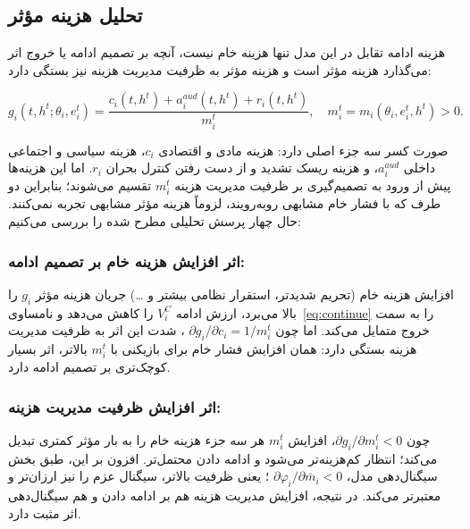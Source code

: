 \documentclass[12pt]{article}
\begin{document}
\subsection{تحلیل هزینه مؤثر}

هزینه ادامه تقابل در این مدل تنها هزینه خام نیست،
 آنچه بر تصمیم ادامه یا خروج اثر می‌گذارد هزینه مؤثر
 است و هزینه مؤثر به ظرفیت مدیریت هزینه نیز بستگی دارد:

\begin{equation}
    \label{eq:geff}
    g_i(t,h^t;\theta_i,e_i^t) = \frac{c_i(t,h^t) + a_i^{aud}(t,h^t) + r_i(t,h^t)}{m_i^t},
    \quad m_i^t = m_i(\theta_i,e_i^t,h^t) > 0.
\end{equation}

صورت کسر سه جزء اصلی دارد: هزینه مادی و اقتصادی 
$c_i$،
 هزینه سیاسی و اجتماعی داخلی 
$a_i^{aud}$،
 و هزینه ریسک تشدید و از دست رفتن کنترل بحران 
 $r_i$. اما این هزینه‌ها پیش از ورود به تصمیم‌گیری بر ظرفیت مدیریت هزینه 
 $m_i^t$
  تقسیم می‌شوند؛ بنابراین دو طرف که با فشار خام
   مشابهی روبه‌رویند، لزوماً هزینه مؤثر مشابهی تجربه نمی‌کنند.
   حال چهار پرسش تحلیلی مطرح شده را بررسی می‌کنیم:

\subsubsection*{اثر افزایش هزینه خام بر تصمیم ادامه:}
        افزایش هزینه خام 
        (تحریم شدیدتر، استقرار نظامی بیشتر و \dots)
         جریان هزینه مؤثر $g_i$
          را بالا می‌برد، ارزش ادامه $V_i^C$
           را کاهش می‌دهد و نامساوی~\eqref{eq:continue}
            را به سمت خروج متمایل می‌کند. اما چون 
            $\partial g_i/\partial c_i = 1/m_i^t$
            ، شدت این اثر به ظرفیت مدیریت هزینه بستگی دارد:
             همان افزایش فشار خام برای بازیکنی با 
             $m_i^t$
         بالاتر، اثر بسیار کوچک‌تری بر تصمیم ادامه دارد.
        
\subsubsection*{اثر افزایش ظرفیت مدیریت هزینه:}
        چون $\partial g_i/\partial m_i^t < 0$،
         افزایش $m_i^t$
          هر سه جزء هزینه خام را به
           بار مؤثر کمتری تبدیل می‌کند؛ انتظار کم‌هزینه‌تر می‌شود و
           ادامه دادن محتمل‌تر. افزون بر این، طبق بخش سیگنال‌دهی مدل،
            $\partial \varphi_i/\partial \bar{m}_i < 0$
            ؛ یعنی ظرفیت بالاتر، سیگنال عزم را نیز
     ارزان‌تر و معتبرتر می‌کند.
     در نتیجه، افزایش مدیریت هزینه هم بر ادامه
     دادن و هم سیگنال‌دهی 
     اثر مثبت دارد.
        
\end{document}
